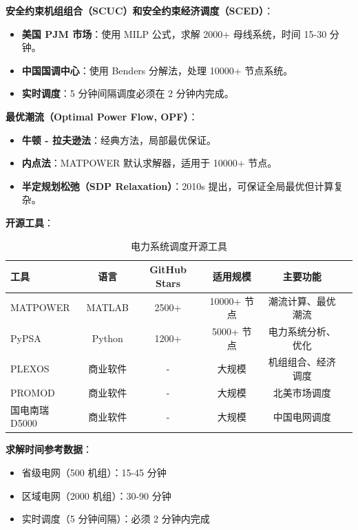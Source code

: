 \documentclass[12pt,a4paper]{article}
\begin{document}
\textbf{安全约束机组组合（SCUC）和安全约束经济调度（SCED）}：

\begin{itemize}
    \item \textbf{美国 PJM 市场}：使用 MILP 公式，求解 2000+ 母线系统，时间 15-30 分钟\cite{li2021security}。
    
    \item \textbf{中国国调中心}：使用 Benders 分解法，处理 10000+ 节点系统。
    
    \item \textbf{实时调度}：5 分钟间隔调度必须在 2 分钟内完成。
\end{itemize}

\textbf{最优潮流（Optimal Power Flow, OPF）}：

\begin{itemize}
    \item \textbf{牛顿 - 拉夫逊法}：经典方法，局部最优保证。
    
    \item \textbf{内点法}：MATPOWER 默认求解器，适用于 10000+ 节点\cite{matpower}。
    
    \item \textbf{半定规划松弛（SDP Relaxation）}：2010s 提出，可保证全局最优但计算复杂。
\end{itemize}

\textbf{开源工具}：

\begin{table}[h]
\centering
\caption{电力系统调度开源工具}
\label{tab:power-tools}
\begin{tabular}{@{}lccccl@{}}
\toprule
\textbf{工具} & \textbf{语言} & \textbf{GitHub Stars} & \textbf{适用规模} & \textbf{主要功能} \\
\midrule
MATPOWER & MATLAB & 2500+ & 10000+ 节点 & 潮流计算、最优潮流 \\
PyPSA & Python & 1200+ & 5000+ 节点 & 电力系统分析、优化 \\
PLEXOS & 商业软件 & - & 大规模 & 机组组合、经济调度 \\
PROMOD & 商业软件 & - & 大规模 & 北美市场调度 \\
国电南瑞 D5000 & 商业软件 & - & 大规模 & 中国电网调度 \\
\bottomrule
\end{tabular}
\end{table}

\textbf{求解时间参考数据}：

\begin{itemize}
    \item 省级电网（500 机组）：15-45 分钟
    \item 区域电网（2000 机组）：30-90 分钟
    \item 实时调度（5 分钟间隔）：必须 2 分钟内完成
\end{itemize}
\end{document}
